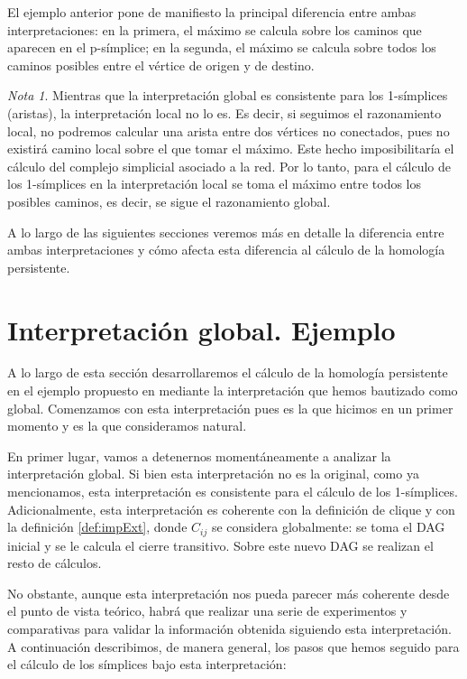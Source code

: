 \documentclass[12pt, a4paper, twoside]{book}
\numberwithin{equation}{section}
\theoremstyle{definition}
\theoremstyle{remark}
\newtheorem*{remark}{Nota}
\theoremstyle{plain}
\begin{document}
	El ejemplo anterior pone de manifiesto la principal diferencia 
	entre ambas interpretaciones: en la primera, el máximo se 
	calcula sobre los caminos que aparecen en el p-símplice; en la 
	segunda, el máximo se calcula sobre todos los caminos posibles entre el 
	vértice de origen y de destino. 
	\begin{remark}
		Mientras que la interpretación global es consistente 
		para los 1-símplices (aristas), la interpretación 
		local no lo es. Es decir, si seguimos el razonamiento local, 
		no podremos calcular una arista entre dos vértices no 
		conectados, pues no existirá camino local sobre el que tomar 
		el máximo. Este hecho imposibilitaría el cálculo del complejo 
		simplicial asociado a la red. Por lo tanto, para el cálculo de 
		los 1-símplices en la interpretación local se toma el máximo 
		entre todos los posibles caminos, es decir, se sigue el 
		razonamiento global. 
	\end{remark}
	
	A lo largo de las siguientes secciones veremos más en detalle la 
	diferencia entre ambas interpretaciones y cómo afecta esta diferencia
	al cálculo de la homología persistente.

	\section{Interpretación global. Ejemplo}
	
	A lo largo de esta sección desarrollaremos el cálculo de la homología
	persistente en el ejemplo propuesto en \cite{Articulo-Watanabe} 
	mediante la interpretación que hemos bautizado como global. Comenzamos
	con esta interpretación pues es la que hicimos en un primer momento y 
	es la que consideramos natural.

	En primer lugar, vamos a detenernos momentáneamente a analizar la 
	interpretación global. Si bien esta interpretación no es la original, 
	como ya mencionamos, esta interpretación es consistente para el 
	cálculo de los 1-símplices. Adicionalmente, esta interpretación es 
	coherente con la definición de clique y con la definición 
	\ref{def:impExt}, donde $C_{ij}$ se considera globalmente: se toma el 
	DAG
	inicial y se le calcula el cierre transitivo. Sobre este nuevo DAG se
	realizan el resto de cálculos.

	No obstante, aunque esta interpretación nos pueda parecer más 
	coherente desde el punto de vista teórico, habrá que realizar una 
	serie de experimentos y comparativas para validar la información 
	obtenida siguiendo esta interpretación. A continuación describimos, de
	manera general, los pasos que hemos seguido para el cálculo de los 
	símplices bajo esta interpretación: 
\end{document}
